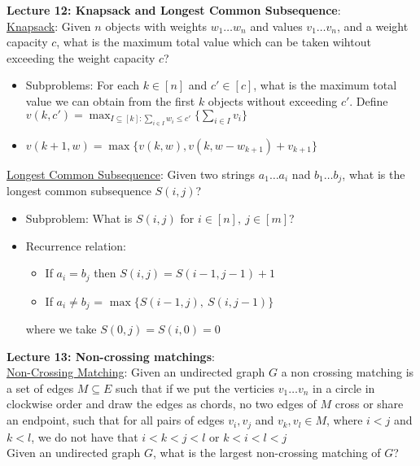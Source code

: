 \documentclass{article}
\begin{document}
\textbf{Lecture 12: Knapsack and Longest Common Subsequence}: \\[1.0ex]
\underline{Knapsack}: Given $n$ objects with weights $w_1 \dots w_n$ and values $v_1 \dots v_n$, and a weight capacity $c$, what is the maximum total value which can be taken wihtout exceeding the weight capacity $c$?
\begin{itemize}
    \item Subproblems: For each $k \in [n]$ and $c' \in [c]$, what is the maximum total value we can obtain from the first $k$ objects without exceeding $c'$. Define $v(k, c') = \max_{I \subseteq [k]:\sum_{i \in I}w_i \leq c'}\{\sum_{i \in I}v_i\}$
    \item $v(k + 1, w) = \max\{v(k, w), v(k, w - w_{k + 1}) + v_{k + 1}\}$
\end{itemize}
\underline{Longest Common Subsequence}: Given two strings $a_1 \dots a_i$ nad $b_1 \dots b_j$, what is the longest common subsequence $S(i, j)$?
\begin{itemize}
    \item Subproblem: What is $S(i, j)$ for $i \in [n],\ j \in [m]$?
    \item Recurrence relation:
    \begin{itemize}
        \item If $a_i = b_j$ then $S(i, j) = S(i - 1, j - 1) + 1$
        \item If $a_i \neq b_j$ = $\max\{S(i - 1, j),\ S(i, j - 1)\}$
    \end{itemize}
    where we take $S(0, j) = S(i, 0) = 0$
\end{itemize}
\textbf{Lecture 13: Non-crossing matchings}: \\[1.0ex]
\underline{Non-Crossing Matching}: Given an undirected graph $G$ a non crossing matching is a set of edges $M \subseteq E$ such that if we put the verticies $v_1 \dots v_n$ in a circle in clockwise order and draw the edges as chords, no two edges of $M$ cross or share an endpoint, such that for all pairs of edges $v_i, v_j$ and $v_k, v_l \in M$, where $i < j$ and $k < l$, we do not have that $i < k < j < l$ or $k < i < l < j$ \\[0.5ex]
Given an undirected graph $G$, what is the largest non-crossing matching of $G$?
\end{document}
